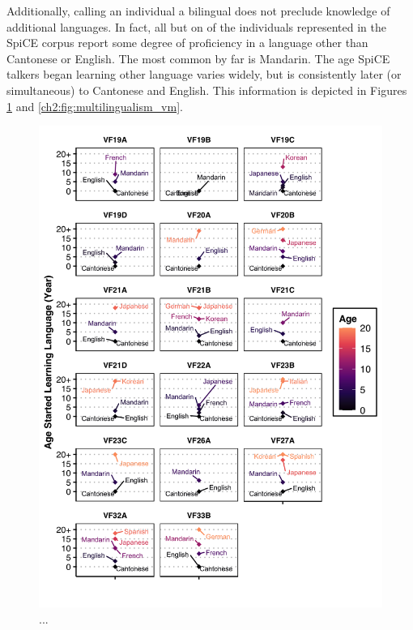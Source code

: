 Additionally, calling an individual a bilingual does not preclude knowledge of additional languages. In fact, all but on of the individuals represented in the SpiCE corpus report some degree of proficiency in a language other than Cantonese or English. The most common by far is Mandarin. The age SpiCE talkers began learning other language varies widely, but is consistently later (or simultaneous) to Cantonese and English. This information is depicted in Figures \ref{ch2:fig:multilingualism_vf} and \ref{ch2:fig:multilingualism_vm}.

\begin{figure}[!htbp]
  \begin{center}
  \includegraphics[width=4.9in]{figures/ch2_multilingualism_vf_5in.png} 
  \caption{...}
  \label{ch2:fig:multilingualism_vf}
  \end{center}
\end{figure}

